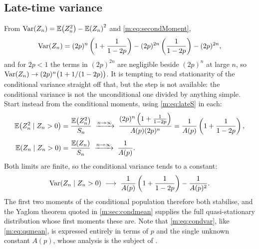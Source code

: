 \subsection*{Late-time variance}

From $\operatorname{Var}\!\left(Z_n\right) = \mathbb{E}\!\left(Z_n^2\right)-\mathbb{E}\!\left(Z_n\right)^2$ and \cref{m:eq:secondMoment},
\begin{equation*}
\operatorname{Var}\!\left(Z_n\right) = (2p)^n\left(1+\frac{1}{1-2p}\right) - (2p)^{2n}\left(\frac{1}{1-2p}\right) - (2p)^{2n},
\end{equation*}
and for $2p<1$ the terms in $(2p)^{2n}$ are negligible beside $(2p)^n$ at large
$n$, so $\operatorname{Var}\!\left(Z_n\right)\to(2p)^n\bigl(1+1/(1-2p)\bigr)$. It is tempting to read
stationarity of the conditional variance straight off that, but the step is not
available: the conditional variance is not the unconditional one divided by
anything simple. Start instead from the conditional moments, using
\cref{m:eq:lateS} in each:
\begin{align*}
\mathbb{E}\!\left(Z_n^2\mid Z_n>0\right) &= \frac{\mathbb{E}\!\left(Z_n^2\right)}{S_n}
\;\xrightarrow{n\to\infty}\;
\frac{(2p)^n\left(1+\frac{1}{1-2p}\right)}{A(p)(2p)^n}
= \frac{1}{A(p)}\left(1+\frac{1}{1-2p}\right),\\[4pt]
\mathbb{E}\!\left(Z_n\mid Z_n>0\right) &= \frac{\mathbb{E}\!\left(Z_n\right)}{S_n}
\;\xrightarrow{n\to\infty}\;
\frac{1}{A(p)} .
\end{align*}
Both limits are finite, so the conditional variance tends to a constant:
\begin{equation}
\label{m:eq:condvar}
\operatorname{Var}\!\left(Z_n\mid Z_n>0\right) \;\longrightarrow\;
\frac{1}{A(p)}\left(1+\frac{1}{1-2p}\right) - \frac{1}{A(p)^2} .
\end{equation}
The first two moments of the conditional population therefore both stabilise,
and the Yaglom theorem quoted in \cref{m:sec:condmean} supplies the full
quasi-stationary distribution whose first moments these are. Note that
\cref{m:eq:condvar}, like \cref{m:eq:qsmean}, is expressed entirely in terms of
$p$ and the single unknown constant $A(p)$, whose analysis is the subject of
\ChA.

\FloatBarrier
